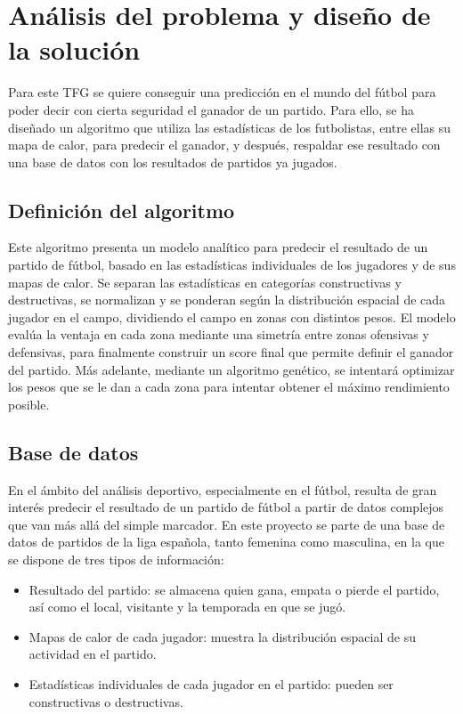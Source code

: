 \chapter{Análisis del problema y diseño de la solución}

Para este TFG se quiere conseguir una predicción en el mundo del fútbol para poder decir con cierta seguridad el ganador de un partido. Para ello, se ha diseñado un algoritmo que utiliza las estadísticas de los futbolistas, entre ellas su mapa de calor, para predecir el ganador, y después, respaldar ese resultado con una base de datos con los resultados de partidos ya jugados.

\section*{Definición del algoritmo}
Este algoritmo presenta un modelo analítico para predecir el resultado de un partido de fútbol, basado en las estadísticas individuales de los jugadores y de sus mapas de calor. Se separan las estadísticas en categorías constructivas y destructivas, se normalizan y se ponderan según la distribución espacial de cada jugador en el campo, dividiendo el campo en zonas con distintos pesos. El modelo evalúa la ventaja en cada zona mediante una simetría entre zonas ofensivas y defensivas, para finalmente construir un score final que permite definir el ganador del partido. Más adelante, mediante un algoritmo genético, se intentará optimizar los pesos que se le dan a cada zona para intentar obtener el máximo rendimiento posible.

\section{Base de datos}
En el ámbito del análisis deportivo, especialmente en el fútbol, resulta de gran interés predecir el resultado de un partido de fútbol a partir de datos complejos que van más allá del simple marcador. En este proyecto se parte de una base de datos de partidos de la liga española, tanto femenina como masculina, en la que se dispone de tres tipos de información:

\begin{itemize}
    \item Resultado del partido: se almacena quien gana, empata o pierde el partido, así como el local, visitante y la temporada en que se jugó.
    \item Mapas de calor de cada jugador: muestra la distribución espacial de su actividad en el partido.
    \item Estadísticas individuales de cada jugador en el partido: pueden ser constructivas o destructivas.
    
\end{itemize}

